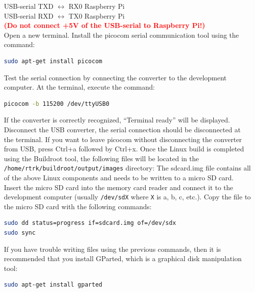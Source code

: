 \documentclass[11pt]{article}
\begin{document}
USB-serial TXD $\leftrightarrow$ RX0 Raspberry Pi \\
USB-serial RXD $\leftrightarrow$ TX0 Raspberry Pi \\
\textbf{\textcolor{red}{(Do not connect +5V of the USB-serial to Raspberry
 Pi!)}} \\
\newline
Open a new terminal. Install the picocom serial communication tool
using the command:
\begin{lstlisting}[language=bash]
sudo apt-get install picocom
\end{lstlisting}
Test the serial connection by connecting the converter to the development
 computer. At the terminal, execute the command:
\begin{lstlisting}[language=bash]
picocom -b 115200 /dev/ttyUSB0
\end{lstlisting}
If the converter is correctly recognized, “Terminal ready” will be displayed.
 Disconnect the USB converter, the serial connection should be disconnected at
 the terminal. If you want to leave picocom without disconnecting the converter
 from USB, press Ctrl+a followed by Ctrl+x.
\newline
\newline
Once the Linux build is completed using the Buildroot tool, the following files
 will be located in the \texttt{/home/rtrk/buildroot/output/images} directory:
\newline
{}%
The sdcard.img file contains all of the above Linux components and needs to be
 written to a micro SD card. Insert the micro SD card into the memory card
 reader and connect it to the development computer (usually \texttt{/dev/sdX}
 where \texttt{X} is a, b, c, etc.). Copy the file to the micro SD card with
 the following commands:
\begin{lstlisting}[language=bash]
sudo dd status=progress if=sdcard.img of=/dev/sdx
sudo sync
\end{lstlisting}
If you have trouble writing files using the previous commands, then it is
 recommended that you install GParted, which is a graphical disk manipulation
 tool:
\begin{lstlisting}[language=bash]
sudo apt-get install gparted
\end{lstlisting}
\end{document}
